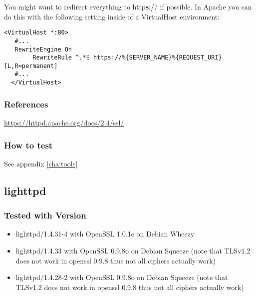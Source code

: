 You might want to redirect everything to http\textbf{s}:// if possible. In Apache you can do this with the following setting inside of a VirtualHost environment:

\begin{lstlisting}[breaklines]
  <VirtualHost *:80>
   #...
   RewriteEngine On
        RewriteRule ^.*$ https://%{SERVER_NAME}%{REQUEST_URI} [L,R=permanent]
   #...
  </VirtualHost>
\end{lstlisting}


\subsubsection{References}
\url{https://httpd.apache.org/docs/2.4/ssl/}


\subsubsection{How to test}

See appendix \ref{cha:tools}



\subsection{lighttpd}


\subsubsection{Tested with Version}
\begin{itemize}
\item lighttpd/1.4.31-4 with OpenSSL 1.0.1e on Debian Wheezy
\item lighttpd/1.4.33 with OpenSSL 0.9.8o on Debian Squeeze (note that TLSv1.2 does not work in openssl 0.9.8 thus not all ciphers actually work)
\item lighttpd/1.4.28-2 with OpenSSL 0.9.8o on Debian Squeeze (note that TLSv1.2 does not work in openssl 0.9.8 thus not all ciphers actually work)
\end{itemize}


